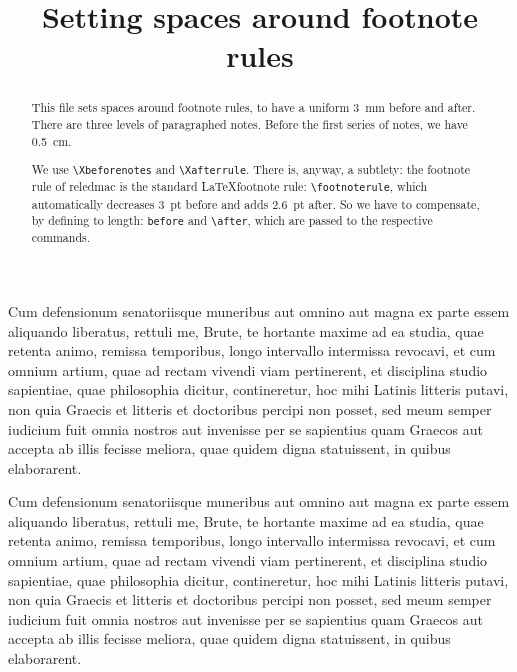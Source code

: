 \documentclass{article}
\newlength{\before} 			%
\newlength{\after}				%
\begin{document}
\begin{english}
\date{}
\title{Setting spaces around footnote rules}
\maketitle
\begin{abstract}
This file sets spaces around footnote rules, to have a uniform \SI{3}{\milli\meter} before and after. There are three levels of paragraphed notes. Before the first series of notes, we have \SI{0.5}{\centi\meter}.

We use \verb+\Xbeforenotes+ and \verb+\Xafterrule+. There is, anyway, a subtlety: the footnote rule of reledmac is the standard \LaTeX footnote rule: \verb+\footnoterule+, which automatically decreases \SI{3}{pt} before and adds \SI{2.6}{pt} after. So we have to compensate, by defining to length:  \verb+before+ and \verb+\after+, which are passed to the respective commands. 
\end{abstract}
\end{english}

\beginnumbering
\pstart%
Cum defensionum  senatoriisque muneribus aut omnino aut magna ex parte essem aliquando liberatus, rettuli me, Brute, te hortante maxime ad ea studia, quae retenta animo, remissa temporibus, longo intervallo intermissa revocavi, et cum omnium artium, quae ad rectam vivendi viam pertinerent,  et disciplina studio sapientiae, quae philosophia dicitur, contineretur, hoc mihi Latinis litteris  putavi, non quia  Graecis et litteris et doctoribus percipi non posset, sed meum semper iudicium fuit omnia nostros aut invenisse per se sapientius quam Graecos aut accepta ab illis fecisse meliora, quae quidem digna statuissent, in quibus elaborarent.
\pend

\pstart%
Cum defensionum  senatoriisque muneribus aut omnino aut magna ex parte essem aliquando liberatus, rettuli me, Brute, te hortante maxime ad ea studia, quae retenta animo, remissa temporibus, longo intervallo intermissa revocavi, et cum omnium artium, quae ad rectam vivendi viam pertinerent,  et disciplina studio sapientiae, quae philosophia dicitur, contineretur, hoc mihi Latinis litteris  putavi, non quia  Graecis et litteris et doctoribus percipi non posset, sed meum semper iudicium fuit omnia nostros aut invenisse per se sapientius quam Graecos aut accepta ab illis fecisse meliora, quae quidem digna statuissent, in quibus elaborarent.
\pend
\end{document}
